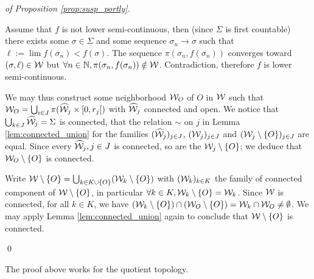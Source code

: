 \begin{proof}[of Proposition \ref{prop:susp_portly}]
\begin{itemize}
 Assume that $f$ is not lower semi-continuous, then (since $\Sigma$ is first countable) there exists some $\sigma\in \Sigma$ and some sequence  $\sigma_n\rightarrow  \sigma$ such that $\ell:=\lim f(\sigma_n)<f(\sigma)$. The sequence $\pi(\sigma_n,f(\sigma_n))$ converges toward $(\sigma,\ell) \in \mathcal W$ but $\forall n\in \mathbb{N}, \pi(\sigma_n,f(\sigma_n)) \notin \mathcal W$. Contradiction, therefore $f$ is lower semi-continuous.

 We may thus construct some neighborhood $\mathcal W_O$ of $O$ in $\mathcal W$ such that $\mathcal W_O = \bigcup_{i\in J} \pi(\widehat {\mathcal W}_j \times [0,r_j[)$ with $\widehat {\mathcal W}_j$ connected and open. We notice that $\bigcup_{k\in J} \widehat {\mathcal W}_j = \Sigma$ is connected, that the relation $\sim$ on $j$ in Lemma \ref{lem:connected_union} 
 for the families $(\widehat {\mathcal W}_j)_{j\in J}$, $(\mathcal W_j)_{j\in J}$ and $(\mathcal W_j\setminus \{O\})_{j\in J}$ are equal. Since every $\widehat {\mathcal W}_j, j\in J$ is connected, so are the $\mathcal W_j\setminus \{O\}$;    we deduce that $\mathcal W_O\setminus \{O\}$ is connected.  
 
 Write $\mathcal W\setminus \{O\} = \bigcup_{k\in K\cup \{O\}} (\mathcal W_k\setminus \{O\})$ 
 with $(\mathcal W_k)_{k\in K}$ the family of connected component of $\mathcal W\setminus \{O\}$, in particular $\forall k\in K, \mathcal W_k\setminus \{O\}=\mathcal W_k$. Since $\mathcal W$ is connected, for all $k\in K$, we have $(\mathcal W_k\setminus \{O\}) \cap (\mathcal W_O \setminus \{O\})=\mathcal W_k\cap \mathcal W_O \neq \emptyset$. We may apply Lemma \ref{lem:connected_union} again to conclude that $\mathcal W\setminus \{O\}$ is connected.
 
 \end{itemize}
\qed\end{proof}
\begin{rem}\label{rem:proof_above_works_quotient} The proof above works for the quotient topology.
 
\end{rem}

 



 

